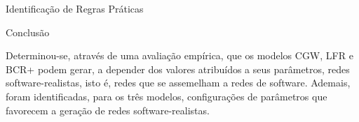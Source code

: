 \begin{section}{Identificação de Regras Práticas}


\end{section}

\begin{section}{Conclusão}
	
	Determinou-se, através de uma avaliação empírica, que os modelos CGW, LFR e BCR+ podem gerar, a depender dos valores atribuídos a seus parâmetros, redes software-realistas, isto é, redes que se assemelham a redes de software. 
	Ademais, foram identificadas, para os três modelos, configurações de parâmetros que favorecem a geração de redes software-realistas.
	
	
\end{section}
 
